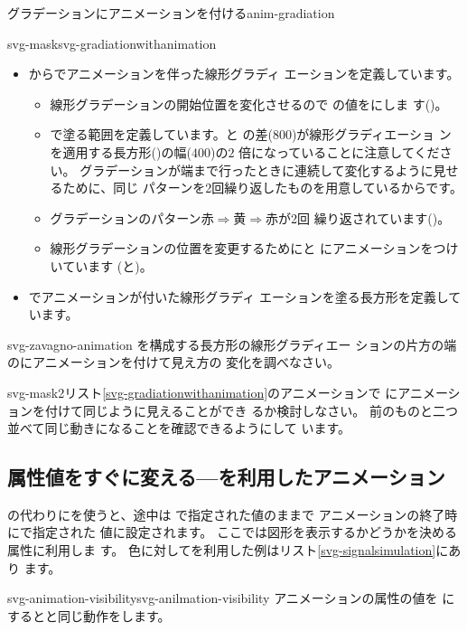 {グラデーションにアニメーションを付ける}{anim-gradiation} 

     {svg-mask}{svg-gradiationwithanimation}
\begin{itemize}
 \item {}からでアニメーションを伴った線形グラディ
       エーションを定義しています。
\begin{itemize}
 \item 線形グラデーションの開始位置を変化させるので
       の値をにしま
       す()。
 \item {}で塗る範囲を定義しています。と
       の差($800$)が線形グラディエーショ
       ンを適用する長方形()の幅($400$)の$2$
       倍になっていることに注意してください。
グラデーションが端まで行ったときに連続して変化するように見せるために、同じ
       パターンを2回繰り返したものを用意しているからです。
 \item グラデーションのパターン$赤\Rightarrow 黄\Rightarrow 赤$が2回
       繰り返されています()。
 \item 線形グラデーションの位置を変更するためにと
       にアニメーションをつけいています
       (と)。
\end{itemize}
 \item {}でアニメーションが付いた線形グラディ
       エーションを塗る長方形を定義しています。
\end{itemize}

{svg-zavagno-animation}
{%
を構成する長方形の線形グラディエー
 ションの片方の端のにアニメーションを付けて見え方の
 変化を調べなさい。}

{svg-mask2}{リスト\ref{svg-gradiationwithanimation}のアニメーションで
 にアニメーションを付けて同じように見えることができ
 るか検討しなさい。}
{前のものと二つ並べて同じ動きになることを確認できるようにして
 います。}

\subsection{属性値をすぐに変える---を利用したアニメーション}
\label{visibility-hidden}
の代わりにを使うと、途中は
で指定された値のままで
アニメーションの終了時にで指定された
値に設定されます。
ここでは図形を表示するかどうかを決める属性に利用しま
す。
%
色に対してを利用した例はリスト\ref{svg-signalsimulation}にあり
ます。%

%
{svg-animation-visibility}{svg-anilmation-visibility}
アニメーションの属性の値を
にするとと同じ動作をします。
